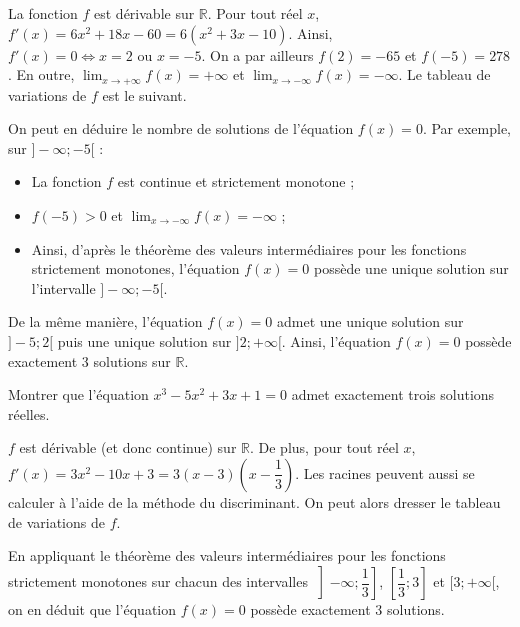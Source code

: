 \documentclass[11pt,fleqn, openany]{book} %
\begin{document}
\begin{solution}La fonction $f$ est dérivable sur $\mathbb{R}$. Pour tout réel $x$,  $f'(x)=6x^2+18x-60=6(x^2+3x-10)$. Ainsi, $f'(x)=0 \Leftrightarrow x=2 \text{ ou } x=-5$. On a par ailleurs $f(2)=-65$ et $f(-5)=278$. En outre, $\displaystyle\lim_{x \to +\infty} f(x)=+\infty$ et $\displaystyle \lim_{x \to -\infty} f(x)=-\infty$. Le tableau de variations de $f$ est le suivant.

\begin{center}
\end{center}

On peut en déduire le nombre de solutions de l'équation $f(x)=0$. Par exemple, sur $]-\infty ;-5[$ :
\begin{itemize}
\item La fonction $f$ est continue et strictement monotone ;
\item $f(-5)>0$ et $\displaystyle\lim_{x \to -\infty} f(x)=-\infty$ ;
\item Ainsi, d'après le théorème des valeurs intermédiaires pour les fonctions strictement monotones, l'équation $f(x)=0$ possède une unique solution sur l'intervalle $]-\infty ; -5[$.
\end{itemize}
De la même manière, l'équation $f(x)=0$ admet une unique solution sur $]-5;2[$ puis une unique solution sur $]2;+\infty[$. Ainsi, l'équation $f(x)=0$ possède exactement 3 solutions sur $\mathbb{R}$.\end{solution}




\begin{exercise}[topic=cont03]Montrer que l'équation $x^3-5x^2+3x+1=0$ admet exactement trois solutions réelles.\end{exercise}

\begin{solution} $f$ est dérivable (et donc continue) sur $\mathbb{R}$. De plus, pour tout réel $x$, $f'(x)=3x^2-10x+3=3(x-3)\left(x-\dfrac{1}{3}\right)$. Les racines peuvent aussi se calculer à l'aide de la méthode du discriminant. On peut alors dresser le tableau de variations de $f$.

\begin{center}
\end{center}

En appliquant le théorème des valeurs intermédiaires pour les fonctions strictement monotones sur chacun des intervalles $\left]-\infty ; \dfrac{1}{3}\right ]$, $\left[ \dfrac{1}{3}; 3 \right]$ et $[3;+\infty [$, on en déduit que l'équation $f(x)=0$ possède exactement 3 solutions.\end{solution}
\end{document}
